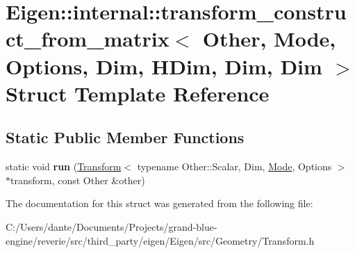 \hypertarget{struct_eigen_1_1internal_1_1transform__construct__from__matrix_3_01_other_00_01_mode_00_01_optio6dcff4dd79db682c85f7e1f5d15fb563}{}\section{Eigen\+::internal\+::transform\+\_\+construct\+\_\+from\+\_\+matrix$<$ Other, Mode, Options, Dim, H\+Dim, Dim, Dim $>$ Struct Template Reference}
\label{struct_eigen_1_1internal_1_1transform__construct__from__matrix_3_01_other_00_01_mode_00_01_optio6dcff4dd79db682c85f7e1f5d15fb563}
\subsection*{Static Public Member Functions}
\begin{DoxyCompactItemize}
\item 
\mbox{\label{struct_eigen_1_1internal_1_1transform__construct__from__matrix_3_01_other_00_01_mode_00_01_optio6dcff4dd79db682c85f7e1f5d15fb563_af4c45b77c8995f01a933d753f7a5c3b1}} 
static void {\bfseries run} (\mbox{\hyperlink{class_eigen_1_1_transform}{Transform}}$<$ typename Other\+::\+Scalar, Dim, \mbox{\hyperlink{struct_mode}{Mode}}, Options $>$ $\ast$transform, const Other \&other)
\end{DoxyCompactItemize}


The documentation for this struct was generated from the following file\+:\begin{DoxyCompactItemize}
\item 
C\+:/\+Users/dante/\+Documents/\+Projects/grand-\/blue-\/engine/reverie/src/third\+\_\+party/eigen/\+Eigen/src/\+Geometry/Transform.\+h\end{DoxyCompactItemize}
